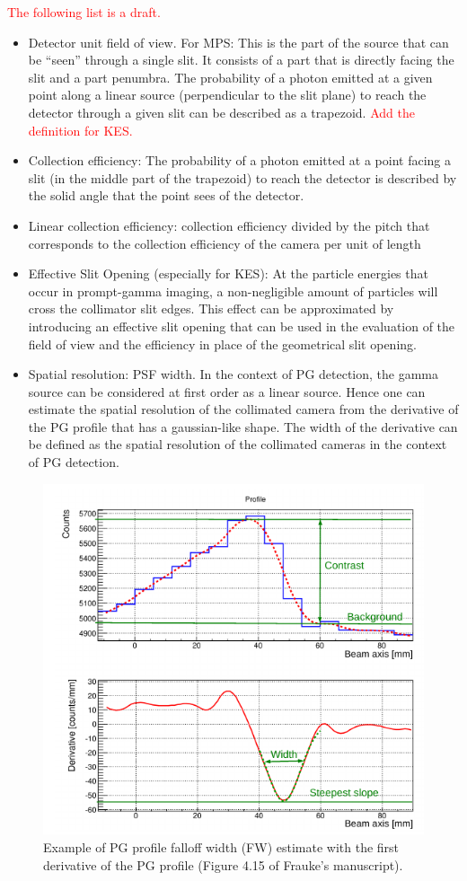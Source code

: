 \documentclass[a4paper,english]{article}
\begin{document}
\textcolor{red}{The following list is a draft.}
\begin{itemize}
  \item Detector unit field of view. For MPS: This is the part of the source that can be “seen” through a single slit. It consists of a part that is directly facing the slit and a part penumbra. The probability of a photon emitted at a given point along a linear source (perpendicular to the slit plane) to reach the detector through a given slit can be described as a trapezoid. \textcolor{red}{Add the definition for KES.}
  \item Collection efficiency: The probability of a photon emitted at a point facing a slit (in the middle part of the trapezoid) to reach the detector is described by the solid angle that the point sees of the detector.
  \item Linear collection efficiency: collection efficiency divided by the pitch that corresponds to the collection efficiency of the camera per unit of length
  \item Effective Slit Opening (especially for KES): At the particle energies that occur in prompt-gamma imaging, a non-negligible amount of particles will cross the collimator slit edges. This effect can be approximated by introducing an effective slit opening that can be used in the evaluation of the field of view and the efficiency in place of the geometrical slit opening. 
  \item Spatial resolution: PSF width. In the context of PG detection, the gamma source can be considered at first order as a linear source. Hence one can estimate the spatial resolution of the collimated camera from the derivative of the PG profile that has a gaussian-like shape. The width of the derivative can be defined as the spatial resolution of the collimated cameras in the context of PG detection.
\end{itemize}

\begin{figure}[htp]
    \centering
    \includegraphics[width=.45\textwidth]{PGprofile_FW}
    \caption{\label{PGprofile_FW}Example of PG profile falloff width (FW) estimate with the first derivative of the PG profile (Figure 4.15 of Frauke's manuscript).}
\end{figure}          
\end{document}
